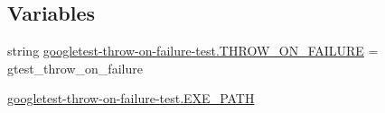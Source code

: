 \subsection*{Variables}
\begin{DoxyCompactItemize}
\item 
string \mbox{\hyperlink{namespacegoogletest-throw-on-failure-test_a7c90464af153ebb6f0e221d66dbc71f1}{googletest-\/throw-\/on-\/failure-\/test.\+T\+H\+R\+O\+W\+\_\+\+O\+N\+\_\+\+F\+A\+I\+L\+U\+RE}} = \textquotesingle{}gtest\+\_\+throw\+\_\+on\+\_\+failure\textquotesingle{}
\item 
\mbox{\hyperlink{namespacegoogletest-throw-on-failure-test_a9cf7f6bcb466c8346b1aacec917a09c1}{googletest-\/throw-\/on-\/failure-\/test.\+E\+X\+E\+\_\+\+P\+A\+TH}}
\end{DoxyCompactItemize}
